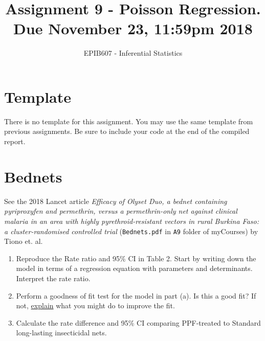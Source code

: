\documentclass[letterpaper,9pt,twoside,printwatermark=false]{pinp}
\title{Assignment 9 - Poisson Regression. Due November 23, 11:59pm 2018}
\author[a]{EPIB607 - Inferential Statistics}
\affil[a]{Fall 2018, McGill University}
\providecommand{\tightlist}{%
  \setlength{\itemsep}{0pt}\setlength{\parskip}{0pt}}
\begin{document}
\verticaladjustment{-2pt}

\maketitle
\thispagestyle{firststyle}



\section*{Template}\label{template}

There is no template for this assignment. You may use the same template
from previous assignments. Be sure to include your code at the end of
the compiled report.

\section{Bednets}\label{bednets}

See the 2018 Lancet article
\textit{Efficacy of Olyset Duo, a bednet containing pyriproxyfen and permethrin, versus a permethrin-only net against clinical malaria in an area with highly pyrethroid-resistant vectors in rural Burkina Faso: a cluster-randomised controlled trial}
(\texttt{Bednets.pdf} in \texttt{A9} folder of myCourses) by Tiono et.
al.

\begin{enumerate}
\def\labelenumi{\alph{enumi}.}
\tightlist
\item
  Reproduce the Rate ratio and 95\% CI in Table 2. Start by writing down
  the model in terms of a regression equation with parameters and
  determinants. Interpret the rate ratio.
\item
  Perform a goodness of fit test for the model in part (a). Is this a
  good fit? If not, \underline{explain} what you might do to improve the
  fit.
\item
  Calculate the rate difference and 95\% CI comparing PPF-treated to
  Standard long-lasting insecticidal nets.
\end{enumerate}
\end{document}
